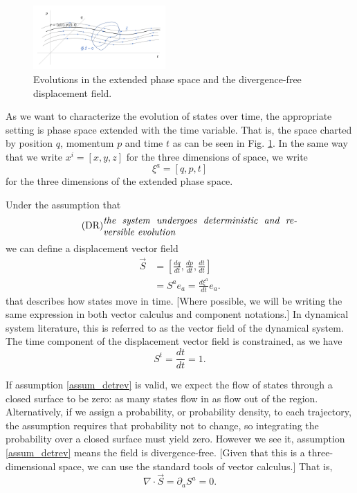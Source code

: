\documentclass[fleqn,10pt]{wlscirep}
\begin{document}
\begin{figure}
	\includegraphics[width = 0.45\textwidth]{ExtendedPhaseSpace}
	\caption{\footnotesize{Evolutions in the extended phase space and the divergence-free displacement field.}}\label{extended_phase_space}
\end{figure}

As we want to characterize the evolution of states over time, the appropriate setting is phase space extended with the time variable\cite{lanczos1949variational,synge1960encyclopedia}. That is, the space charted by position $q$, momentum $p$ and time $t$ as can be seen in Fig. \ref{extended_phase_space}. In the same way that we write $x^i = [ x, y, z ]$ for the three dimensions of space, we write
\begin{equation}\label{sdof_variables}
	\xi^a = [ q, p, t]
\end{equation}
for the three dimensions of the extended phase space.

Under the assumption that
\begin{align}\label{assum_detrev}
	\tag*{(DR)}
	\parbox{2.8in}{\emph{the system undergoes deterministic and reversible evolution}}
\end{align}
we can define a displacement vector field
\begin{equation}\label{sdof_displacement}
\begin{aligned}
	\vec{S} &= \left[ \frac{dq}{dt},\frac{dp}{dt},\frac{dt}{dt} \right] \\
	&= S^a e_a = \frac{d\xi^a}{dt} e_a .
\end{aligned}
\end{equation}
that describes how states move in time. [Where possible, we will be writing the same expression in both vector calculus and component notations.] In dynamical system literature, this is referred to as the vector field of the dynamical system. The time component of the displacement vector field is constrained, as we have
\begin{equation}\label{sdof_time_constraint}
	S^t=\frac{dt}{dt}=1.
\end{equation}

If assumption \ref{assum_detrev} is valid, we expect the flow of states through a closed surface to be zero: as many states flow in as flow out of the region. Alternatively, if we assign a probability, or probability density, to each trajectory, the assumption requires that probability not to change, so integrating the probability over a closed surface must yield zero. However we see it, assumption \ref{assum_detrev} means the field is divergence-free.  [Given that this is a three-dimensional space, we can use the standard tools of vector calculus.] That is, 
\begin{equation}\label{sdof_div_free}
	\nabla \cdot \vec{S} = \partial_a S^a = 0.
\end{equation}
\end{document}
